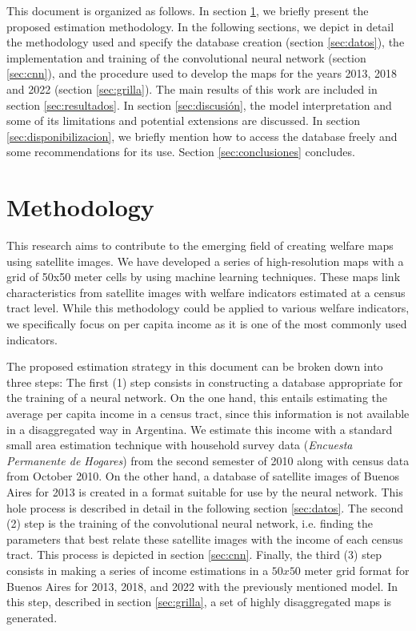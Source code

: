 \documentclass[conference]{IEEEtran}
\begin{document}
This document is organized as follows. In section \ref{sec:metodos}, we briefly present the  proposed estimation methodology. In the following sections, we depict in detail the methodology used and specify the database creation (section \ref{sec:datos}), the implementation and training of the convolutional neural network (section \ref{sec:cnn}), and the procedure used to develop the maps for the years 2013, 2018 and 2022 (section \ref{sec:grilla}). The main results of this work are included in section \ref{sec:resultados}. In section \ref{sec:discusión}, the model interpretation and some of its limitations and potential extensions are discussed. In section \ref{sec:disponibilizacion}, we briefly mention how to access the database freely and some recommendations for its use. Section \ref{sec:conclusiones} concludes.

\section{Methodology}\label{sec:metodos}

This research aims to contribute to the emerging field of creating welfare maps using satellite images. We have developed a series of high-resolution maps with a grid of 50x50 meter cells by using machine learning techniques. These maps link characteristics from satellite images with welfare indicators estimated at a census tract level. While this methodology could be applied to various welfare indicators, we specifically focus on per capita income as it is one of the most commonly used indicators.

The proposed estimation strategy in this document can be broken down into three steps: The first (1) step consists in constructing a database appropriate for the training of a neural network. On the one hand, this entails estimating the average per capita income in a census tract, since this information is not available in a disaggregated way in Argentina. We estimate this income with a standard small area estimation technique \citep{Elbers2003, Gasparini2022} with household survey data (\textit{Encuesta Permanente de Hogares}) from the second semester of 2010 along with census data from October 2010. On the other hand, a database of satellite images of Buenos Aires for 2013 is created in a format suitable for use by the neural network. This hole process is described in detail in the following section \ref{sec:datos}. The second (2) step is the training of the convolutional neural network, i.e. finding the parameters that best relate these satellite images with the income of each census tract. This process is depicted in section \ref{sec:cnn}. Finally, the third (3) step consists in making a series of income estimations in a $50x50$ meter grid format for Buenos Aires for 2013, 2018, and 2022 with the previously mentioned model. In this step, described in section \ref{sec:grilla}, a set of highly disaggregated maps is generated.
\end{document}
